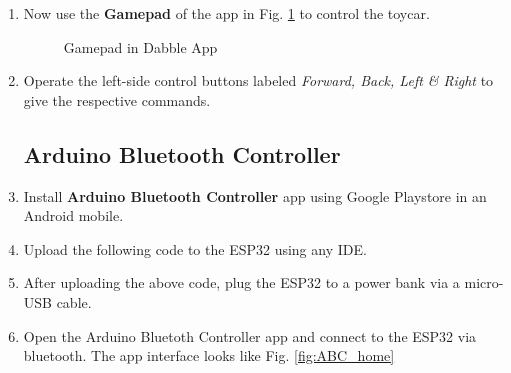 \documentclass[conference]{IEEEtran}
\begin{document}
\begin{enumerate}[label=\thesection.\arabic*
,ref=\thesection.\theenumi]
\item Now use the \textbf{Gamepad} of the app in Fig. \ref{fig:dabble_gamepad} to control the toycar.
\begin{figure}[!ht]
\centering
{}%
\caption{Gamepad in Dabble App}
\label{fig:dabble_gamepad}
\end{figure}

\item Operate the left-side control buttons labeled \textit{Forward, Back, Left \& Right} to give the respective commands.

\subsection{Arduino Bluetooth Controller}

\item Install \textbf{Arduino Bluetooth Controller} app using Google Playstore in an Android mobile.

\item Upload the following code to the ESP32 using any IDE.

\item After uploading the above code, plug the ESP32 to a power bank via a micro-USB cable.

\item Open the Arduino Bluetoth Controller app and connect to the ESP32 via bluetooth. The app interface looks like Fig. \ref{fig:ABC_home}


\end{enumerate}
\end{document}
